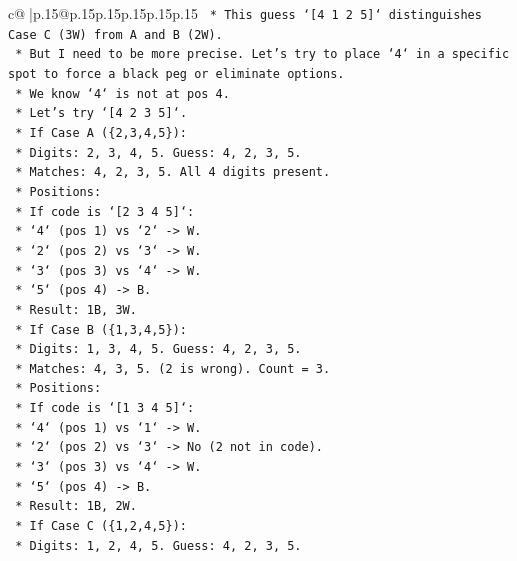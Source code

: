 \documentclass{article}
\begin{document}
{\begin{supertabular}{c@{$\;$}|p{.15\linewidth}@{}p{.15\linewidth}p{.15\linewidth}p{.15\linewidth}p{.15\linewidth}p{.15\linewidth}}
{{{\texttt{    *   This guess `{[}4 1 2 5{]}` distinguishes Case C (3W) from A and B (2W).} \\
\texttt{    *   But I need to be more precise. Let's try to place `4` in a specific spot to force a black peg or eliminate options.} \\
\texttt{    *   We know `4` is not at pos 4.} \\
\texttt{    *   Let's try `{[}4 2 3 5{]}`.} \\
\texttt{        *   If Case A (\{2,3,4,5\}):} \\
\texttt{            *   Digits: 2, 3, 4, 5. Guess: 4, 2, 3, 5.} \\
\texttt{            *   Matches: 4, 2, 3, 5. All 4 digits present.} \\
\texttt{            *   Positions:} \\
\texttt{                *   If code is `{[}2 3 4 5{]}`:} \\
\texttt{                    *   `4` (pos 1) vs `2` {-}> W.} \\
\texttt{                    *   `2` (pos 2) vs `3` {-}> W.} \\
\texttt{                    *   `3` (pos 3) vs `4` {-}> W.} \\
\texttt{                    *   `5` (pos 4) {-}> B.} \\
\texttt{                    *   Result: 1B, 3W.} \\
\texttt{        *   If Case B (\{1,3,4,5\}):} \\
\texttt{            *   Digits: 1, 3, 4, 5. Guess: 4, 2, 3, 5.} \\
\texttt{            *   Matches: 4, 3, 5. (2 is wrong). Count = 3.} \\
\texttt{            *   Positions:} \\
\texttt{                *   If code is `{[}1 3 4 5{]}`:} \\
\texttt{                    *   `4` (pos 1) vs `1` {-}> W.} \\
\texttt{                    *   `2` (pos 2) vs `3` {-}> No (2 not in code).} \\
\texttt{                    *   `3` (pos 3) vs `4` {-}> W.} \\
\texttt{                    *   `5` (pos 4) {-}> B.} \\
\texttt{                    *   Result: 1B, 2W.} \\
\texttt{        *   If Case C (\{1,2,4,5\}):} \\
\texttt{            *   Digits: 1, 2, 4, 5. Guess: 4, 2, 3, 5.} \\
}}}
\end{supertabular}}
\end{document}
